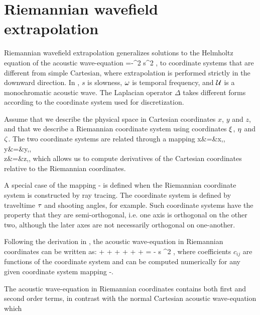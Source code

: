 \section{Riemannian wavefield extrapolation}
Riemannian wavefield extrapolation \cite[]{SavaFomel.geo.rwe}
generalizes solutions to the Helmholtz equation of the acoustic
wave-equation
%
\beq \label{eqn:helmholtz}
\DEL \UU=-\ww^2 s^2 \UU \;,
\eeq 
%
to coordinate systems that are different from simple Cartesian, where
extrapolation is performed strictly in the downward direction. In
, $s$ is slowness, $\omega$ is temporal frequency, and
$\mathcal{U}$ is a monochromatic acoustic wave. The Laplacian operator
$\Delta$ takes different forms according to the coordinate system used
for discretization.
%
\par Assume that we describe the physical space in Cartesian
coordinates $x$, $y$ and $z$, and that we describe a Riemannian
coordinate system using coordinates $\xi$, $\eta$ and $\zeta$. The two
coordinate systems are related through a mapping
%
\beqa \label{eqn:mapx}
x&=&x\lp \qx,\qy,\qz \rp
\\    \label{eqn:mapy}
y&=&y\lp \qx,\qy,\qz \rp
\\    \label{eqn:mapz}
z&=&z\lp \qx,\qy,\qz \rp
\eeqa
%
which allows us to compute derivatives of the Cartesian coordinates
relative to the Riemannian coordinates.
%
\par A special case of the mapping - is defined
when the Riemannian coordinate system is constructed by ray
tracing. The coordinate system is defined by traveltime $\tau$ and
shooting angles, for example. Such coordinate systems have the
property that they are semi-orthogonal, i.e. one axis is orthogonal on
the other two, although the later axes are not necessarily orthogonal
on one-another.
%
\par Following the derivation in \cite{SavaFomel.geo.rwe}, the
acoustic wave-equation in Riemannian coordinates can be written as:
%
\beq \label{eqn:rweacoustic}
\czz \dtwo{\UU}{\qz} +
\cxx \dtwo{\UU}{\qx} + 
\cyy \dtwo{\UU}{\qy} +
\cz  \done{\UU}{\qz} +
\cx  \done{\UU}{\qx} + 
\cy  \done{\UU}{\qy} +
\cxy \mtwo{\UU}{\qx}{\qy} = - \lp \ww s \rp^2 \UU \;,
\eeq
%
where coefficients $c_{ij}$ are functions of the coordinate system and
can be computed numerically for any given coordinate system mapping
-.
%
\par The acoustic wave-equation in Riemannian coordinates
 contains both first and second order terms, in
contrast with the normal Cartesian acoustic wave-equation which
